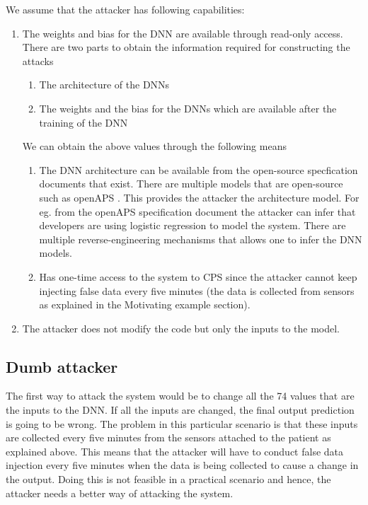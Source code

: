 We assume that the attacker has following capabilities:
\begin{enumerate}
	\item The weights and bias for the DNN are available through read-only access. There are two parts to obtain the information required for constructing the attacks
	\begin{enumerate}
		\item The architecture of the DNNs
		\item The weights and the bias for the DNNs which are available after the training of the DNN
	\end{enumerate}
We can obtain the above values through the following means
\begin{enumerate}
	\item The DNN architecture can be available from the open-source specfication documents that exist. There are multiple models that are open-source such as openAPS \cite{openAPS}. This provides the attacker the architecture model. For eg. from the openAPS specification document the attacker can infer that developers are using  logistic regression to model the system.  
	There are multiple reverse-engineering mechanisms \cite{10.1145/3195970.3196105} that allows one to infer the DNN models.  
	\item Has one-time access to the system to CPS since the attacker cannot keep injecting false data every five minutes (the data is collected from sensors as explained in the Motivating example section).
\end{enumerate}

	\item The attacker does not modify the code but only the inputs to the model.
\end{enumerate}

\subsection{Dumb attacker}
The first way to attack the system would be to change all the 74 values that are the inputs to the DNN. If all the inputs are changed, the final output prediction is going to be wrong. The problem in this particular scenario is that these inputs are collected every five minutes from the sensors attached to the patient as explained above. This means that the attacker will have to conduct false data injection every five minutes when the data is being collected to cause a change in the output. Doing this is not feasible in a practical scenario and hence, the attacker needs a better way of attacking the system. 

